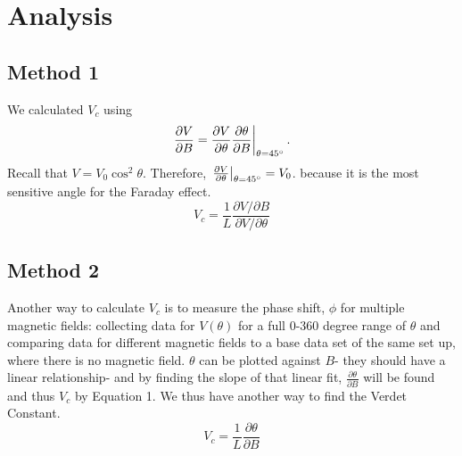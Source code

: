 \documentclass[prb,preprint]{revtex4-1}
\begin{document}
\section{Analysis}
{\subsection{Method 1}

{We calculated $V_{c}$ using 
\begin{equation}
\left. \frac{\partial V}{\partial B}=\frac{\partial V}{\partial \theta} \frac{\partial \theta}{\partial B}\right|_{\theta=45\degree}.
\end{equation}
Recall that
$V=V_{0}\cos^2{\theta}$. Therefore,  $\left.\frac{\partial V}{\partial \theta}\right|_{\theta=45\degree} =V_0$.  because it is the most sensitive angle for the Faraday effect. 
\begin{equation}
V_{c} =\frac{1}{L}  \frac{\partial V/\partial B}{\partial V/\partial \theta} 
\end{equation}

\subsection{Method 2}

Another way to calculate $V_{c}$ is to measure the phase shift, $\phi$ for multiple magnetic fields:  collecting data for $V(\theta)$ for a full 0-360 degree range of $\theta$ and comparing data for different magnetic fields to a base data set of the same set up, where there is no magnetic field.  $\theta$ can be plotted against $B$- they should have a linear relationship- and by finding the slope of that linear fit, $\frac{\partial \theta}{\partial B}$ will be found and thus $V_{c}$ by Equation 1. We thus have another way to find the Verdet Constant.
\begin{equation}
V_{c} =\frac{1}{L} \frac{\partial \theta}{\partial B} 
\end{equation}

}}
\end{document}
